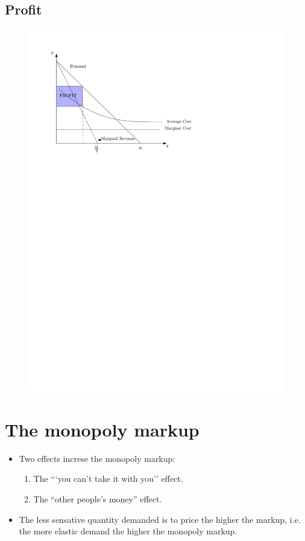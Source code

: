 \documentclass{article}
\begin{document}
\subsection{Profit}
\begin{figure}[!htb]
    \centering
    \includegraphics[]{figs/profit}
\end{figure}



\section{The monopoly markup}
\begin{itemize}
    \item Two effects increse the monopoly markup:
        \begin{enumerate}
            \item The ```you can't take it with you'' effect.
            \item The ``other people's money'' effect.
        \end{enumerate}
    
    \item The less sensative quantity demanded is to price the higher the markup, i.e. the more elastic demand the higher the monopoly markup. 
\end{itemize}
\end{document}
